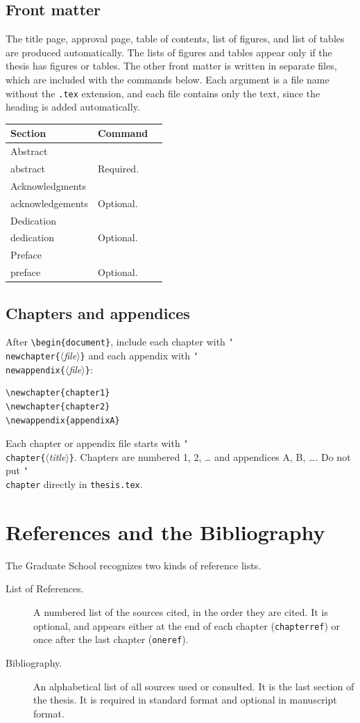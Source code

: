 \documentclass[11pt]{article}
\newcommand\cs[1]{\texttt{\char`\\#1}}
\newcommand\meta[1]{\textit{$\langle$#1$\rangle$}}
\newcommand\marg[1]{\texttt{\{}\meta{#1}\texttt{\}}}
\newcommand\opt[1]{\texttt{#1}}
\newcommand\file[1]{\texttt{#1}}
\begin{document}
\subsection{Front matter}

The title page, approval page, table of contents, list of figures, and list of
tables are produced automatically.
The lists of figures and tables appear only if the thesis has figures or
tables.
The other front matter is written in separate files, which are included with
the commands below.
Each argument is a file name without the \file{.tex} extension, and each file
contains only the text, since the heading is added automatically.

\medskip
\noindent
\begin{tabularx}{\linewidth}{@{}llX@{}}
\toprule
Section & Command & \\
\midrule
Abstract & \cs{abstract}\marg{file} & Required. \\
Acknowledgments & \cs{acknowledgements}\marg{file} & Optional. \\
Dedication & \cs{dedication}\marg{file} & Optional. \\
Preface & \cs{preface}\marg{file} & Optional. \\
\bottomrule
\end{tabularx}

\subsection{Chapters and appendices}

After \verb|\begin{document}|, include each chapter with
\cs{newchapter}\marg{file} and each appendix with \cs{newappendix}\marg{file}:
\begin{verbatim}
\newchapter{chapter1}
\newchapter{chapter2}
\newappendix{appendixA}
\end{verbatim}
Each chapter or appendix file starts with \cs{chapter}\marg{title}.
Chapters are numbered 1, 2, \ldots{} and appendices A, B, \ldots.
Do not put \cs{chapter} directly in \file{thesis.tex}.

\section{References and the Bibliography}

The Graduate School recognizes two kinds of reference lists.
\begin{description}
\item[List of References.] A numbered list of the sources cited, in the order
  they are cited. It is optional, and appears either at the end of each
  chapter (\opt{chapterref}) or once after the last chapter (\opt{oneref}).
\item[Bibliography.] An alphabetical list of all sources used or consulted.
  It is the last section of the thesis. It is required in standard format and
  optional in manuscript format.
\end{description}
\end{document}
